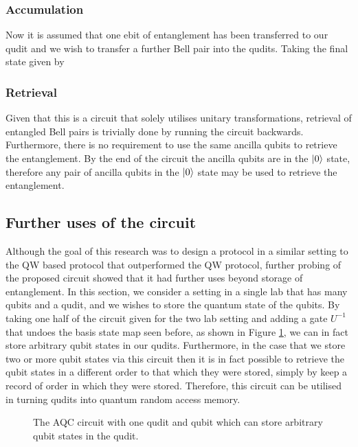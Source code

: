 \subsubsection{Accumulation}
\label{subsubsection:accumulation}
Now it is assumed that one ebit of entanglement has been transferred to our qudit and we wish to transfer a further Bell pair into the qudits. Taking the final state given by 
\subsubsection{Retrieval}
\label{subsubsection:aqcretrieval}
Given that this is a circuit that solely utilises unitary transformations, retrieval of entangled Bell pairs is trivially done by running the circuit backwards. Furthermore, there is no requirement to use the same ancilla qubits to retrieve the entanglement. By the end of the circuit the ancilla qubits are in the $\ket{0}$ state, therefore any pair of ancilla qubits in the $\ket{0}$ state may be used to retrieve the entanglement.

\subsection{Further uses of the circuit}
\label{subsection:furtheruses}
Although the goal of this research was to design a protocol in a similar setting to the QW based protocol that outperformed the QW protocol, further probing of the proposed circuit showed that it had further uses beyond storage of entanglement.
In this section, we consider a setting in a single lab that has many qubits and a qudit, and we wishes to store the quantum state of the qubits.
By taking one half of the circuit given for the two lab setting and adding a gate $U^{-1}$ that undoes the basis state map seen before, as shown in Figure \ref{fig:aqc_qbit_store}, we can in fact store arbitrary qubit states in our qudits.
Furthermore, in the case that we store two or more qubit states via this circuit then it is in fact possible to retrieve the qubit states in a different order to that which they were stored, simply by keep a record of order in which they were stored.
Therefore, this circuit can be utilised in turning qudits into quantum random access memory.

\begin{figure}
    \begin{center}
    \caption{The AQC circuit with one qudit and qubit which can store arbitrary qubit states in the qudit.}
    \label{fig:aqc_qbit_store}
    \end{center}
\end{figure}

